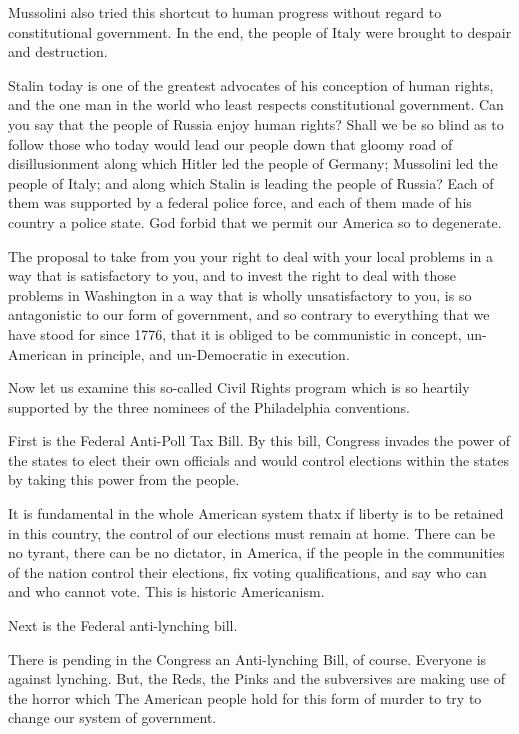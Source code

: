 \documentclass[10pt,a4paper]{article}
\begin{document}
Mussolini also tried this shortcut to human progress without regard to constitutional government. In the end, the people of Italy were brought to despair and destruction.

Stalin today is one of the greatest advocates of his conception of human rights, and the one man in the world who least respects constitutional government. Can you say that the people of Russia enjoy human rights? Shall we be so blind as to follow those who today would lead our people down that gloomy road of disillusionment along which Hitler led the people of Germany; Mussolini led the people of Italy; and along which Stalin is leading the people of Russia? Each of them was supported by a federal police force, and each of them made of his country a police state. God forbid that we permit our America so to degenerate.

The proposal to take from you your right to deal with your local problems in a way that is satisfactory to you, and to invest the right to deal with those problems in Washington in a way that is wholly unsatisfactory to you, is so antagonistic to our form of government, and so contrary to everything that we have stood for since 1776, that it is obliged to be communistic in concept, un-American in principle, and un-Democratic in execution.

Now let us examine this so-called Civil Rights program which is so heartily supported by the three nominees of the Philadelphia conventions.

First is the Federal Anti-Poll Tax Bill. By this bill, Congress invades the power of the states to elect their own officials and would control elections within the states by taking this power from the people.

It is fundamental in the whole American system thatx if liberty is to be retained in this country, the control of our elections must remain at home. There can be no tyrant, there can be no dictator, in America, if the people in the communities of the nation control their elections, fix voting qualifications, and say who can and who cannot vote. This is historic Americanism.

Next is the Federal anti-lynching bill.

There is pending in the Congress an Anti-lynching Bill, of course. Everyone is against lynching. But, the Reds, the Pinks and the subversives are making use of the horror which The American people hold for this form of murder to try to change our system of government.
\end{document}

